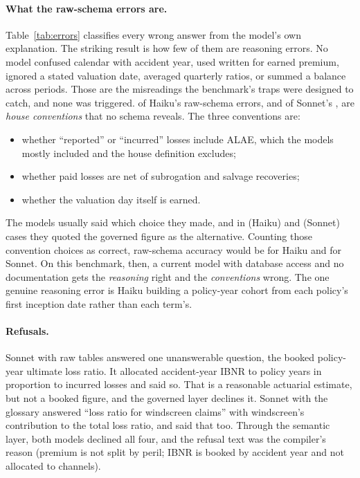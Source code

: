 \paragraph{What the raw-schema errors are.}
Table~\ref{tab:errors} classifies every wrong answer from the model's own explanation. The striking result is
how few of them are reasoning errors. No model confused calendar with accident year, used written for earned
premium, ignored a stated valuation date, averaged quarterly ratios, or summed a balance across periods. Those
are the misreadings the benchmark's traps were designed to catch, and none was triggered. \ConvErrRawHaiku{} of Haiku's
\WrongRawHaiku{} raw-schema errors, and \ConvErrRawSonnet{} of Sonnet's \WrongRawSonnet{}, are \emph{house
conventions} that no schema reveals. The three conventions are:
\begin{itemize}
\item whether ``reported'' or ``incurred'' losses include ALAE, which the models mostly included and the house
definition excludes;
\item whether paid losses are net of subrogation and salvage recoveries;
\item whether the valuation day itself is earned.
\end{itemize}
The models usually said which choice they made, and in \GoldMentionedRawHaiku{} (Haiku) and
\GoldMentionedRawSonnet{} (Sonnet) cases they quoted the governed figure as the alternative. Counting those
convention choices as correct, raw-schema accuracy would be \AdjRawHaiku{} for Haiku and \AdjRawSonnet{} for
Sonnet. On this benchmark, then, a current model with database access and no documentation gets the
\emph{reasoning} right and the \emph{conventions} wrong. The one genuine reasoning error is Haiku building a
policy-year cohort from each policy's first inception date rather than each term's.

\paragraph{Refusals.}
Sonnet with raw tables answered one unanswerable question, the booked policy-year ultimate loss ratio. It
allocated accident-year IBNR to policy years in proportion to incurred losses and said so. That is a reasonable
actuarial estimate, but not a booked figure, and the governed layer declines it. Sonnet with the glossary
answered ``loss ratio for windscreen claims'' with windscreen's contribution to the total loss ratio, and said
that too. Through the semantic layer, both models declined all four, and the refusal text was the compiler's
reason (premium is not split by peril; IBNR is booked by accident year and not allocated to channels).


